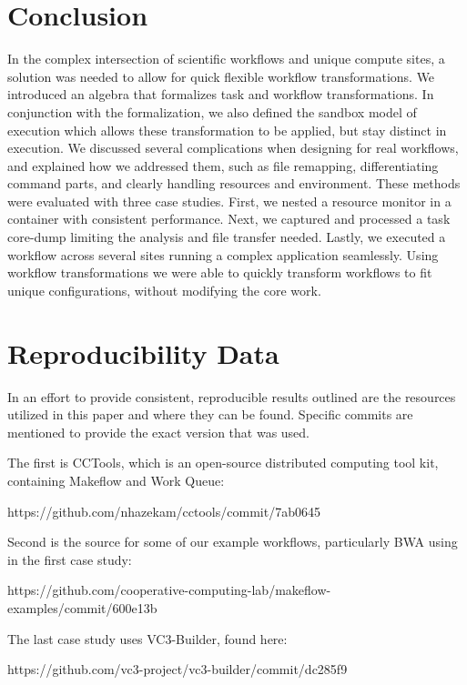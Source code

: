 \documentclass[conference]{IEEEtran}
\begin{document}
\section{Conclusion}

In the complex intersection of scientific
workflows and unique compute sites,
a solution was needed to allow for
quick flexible workflow transformations.
We introduced an algebra that formalizes 
task and workflow transformations. 
In conjunction with the formalization,
we also defined the sandbox model of execution
which allows these transformation to be applied,
but stay distinct in execution. 
We discussed several 
complications when designing for real workflows,
and explained how we addressed them, such as 
file remapping, differentiating command parts,
and clearly handling resources and environment.
These methods were evaluated with three case studies.
First, we nested a resource monitor in a container
with consistent performance.
Next, we captured and processed a task core-dump
limiting the analysis and file transfer needed.
Lastly, we executed a workflow across several sites running a 
complex application seamlessly.
Using workflow transformations
we were able to quickly transform workflows to fit 
unique configurations, without modifying the core work.



\section{Reproducibility Data}

In an effort to provide consistent, reproducible results outlined are the
resources utilized in this paper and where they can be found.
Specific commits are mentioned to provide the exact version that was used.

The first is CCTools, which is an open-source distributed computing 
tool kit, containing Makeflow and Work Queue:
\begin{framed}
\noindent
{\small https://github.com/nhazekam/cctools/commit/7ab0645}
\end{framed}

Second is the source for some of our example workflows,
particularly BWA using in the first case study:
\begin{framed}
\noindent
{\small https://github.com/cooperative-computing-lab/makeflow-examples/commit/600e13b}
\end{framed}

The last case study uses VC3-Builder, found here:
\begin{framed}
\noindent
{\small https://github.com/vc3-project/vc3-builder/commit/dc285f9}
\end{framed}
\end{document}
